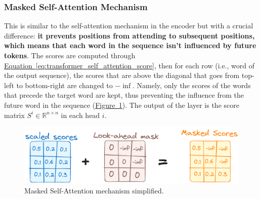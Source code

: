 \documentclass[12pt]{article}
\begin{document}
\subsubsection{Masked Self-Attention Mechanism}
This is similar to the self-attention mechanism in the encoder but with a crucial difference: \textbf{it prevents 
positions from attending to subsequent positions, which means that each word in the sequence isn't influenced 
by future tokens}. The scores are computed through 
\hyperref[eq:transformer_self_attention_score]{Equation~\ref*{eq:transformer_self_attention_score}}, then for each 
row (i.e., word of the output sequence), the scores that are above the diagonal that goes from top-left to bottom-right
are changed to $-\inf$. Namely, only the scores of the words that precede the target word are kept, thus 
preventing the influence from the future word in the sequence (\hyperref[fig:transformer_decoder_self_attention]{Figure~\ref*{fig:transformer_decoder_self_attention}}).
The output of the layer is the score matrix $S^i \in \mathbb{R}^{n \times n}$ in each head $i$.

\begin{figure}
    \centering
    \includegraphics[width=.5\textwidth]{Images/transformer_decoder_self_attention.png}
    \caption{Masked Self-Attention mechanism simplified.}
    \label{fig:transformer_decoder_self_attention}
\end{figure}
\end{document}
